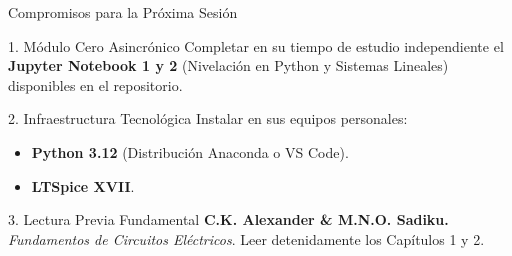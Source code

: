 \documentclass[aspectratio=169]{beamer}
\begin{document}
\begin{frame}{Compromisos para la Próxima Sesión}
    \begin{block}{1. Módulo Cero Asincrónico}
        Completar en su tiempo de estudio independiente el \textbf{Jupyter Notebook 1 y 2} (Nivelación en Python y Sistemas Lineales) disponibles en el repositorio.
    \end{block}
    
    \begin{block}{2. Infraestructura Tecnológica}
        Instalar en sus equipos personales:
        \begin{itemize}
            \item \textbf{Python 3.12} (Distribución Anaconda o VS Code).
            \item \textbf{LTSpice XVII}.
        \end{itemize}
    \end{block}
    
    \begin{block}{3. Lectura Previa Fundamental}
        \textbf{C.K. Alexander \& M.N.O. Sadiku.} \textit{Fundamentos de Circuitos Eléctricos}. Leer detenidamente los Capítulos 1 y 2.
    \end{block}
\end{frame}
\end{document}
